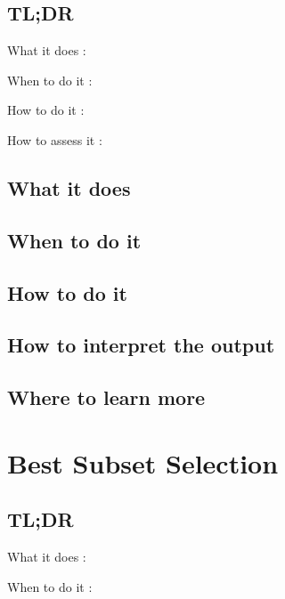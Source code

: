 \documentclass[
]{book}
\begin{document}
\hypertarget{tldr-10}{%
\section{TL;DR}\label{tldr-10}}

What it does
:

When to do it
:

How to do it
:

How to assess it
:

\hypertarget{what-it-does-10}{%
\section{What it does}\label{what-it-does-10}}

\hypertarget{when-to-do-it-10}{%
\section{When to do it}\label{when-to-do-it-10}}

\hypertarget{how-to-do-it-10}{%
\section{How to do it}\label{how-to-do-it-10}}

\hypertarget{how-to-interpret-the-output-10}{%
\section{How to interpret the output}\label{how-to-interpret-the-output-10}}

\hypertarget{where-to-learn-more-10}{%
\section{Where to learn more}\label{where-to-learn-more-10}}

\hypertarget{best-subset-selection}{%
\chapter{Best Subset Selection}\label{best-subset-selection}}

\hypertarget{tldr-11}{%
\section{TL;DR}\label{tldr-11}}

What it does
:

When to do it
:
\end{document}
